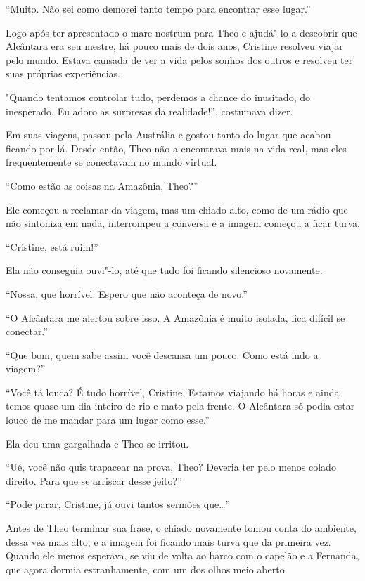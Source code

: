 ``Muito. Não sei como demorei tanto tempo para encontrar esse lugar.''

Logo após ter apresentado o mare nostrum para Theo e ajudá"-lo a
descobrir que Alcântara era seu mestre, há pouco mais de dois anos,
Cristine resolveu viajar pelo mundo. Estava cansada de ver a vida
pelos sonhos dos outros e resolveu ter suas próprias experiências.

"Quando tentamos controlar tudo, perdemos a chance do inusitado, do
inesperado. Eu adoro as surpresas da realidade!'', costumava dizer.

Em suas viagens, passou pela Austrália e gostou tanto do lugar que
acabou ficando por lá. Desde então, Theo não a encontrava mais na vida
real, mas eles frequentemente se conectavam no mundo virtual.

``Como estão as coisas na Amazônia, Theo?''

Ele começou a reclamar da viagem, mas um chiado alto, como de um rádio
que não sintoniza em nada, interrompeu a conversa e a imagem começou a
ficar turva.

``Cristine, está ruim!''

Ela não conseguia ouvi"-lo, até que tudo foi ficando silencioso novamente.

``Nossa, que horrível. Espero que não aconteça de novo.''

``O Alcântara me alertou sobre isso. A Amazônia é muito isolada, fica
difícil se conectar.''

``Que bom, quem sabe assim você descansa um pouco. Como está indo a
viagem?''

``Você tá louca? É tudo horrível, Cristine. Estamos viajando há horas e
ainda temos quase um dia inteiro de rio e mato pela frente. O Alcântara
só podia estar louco de me mandar para um lugar como esse.''

Ela deu uma gargalhada e Theo se irritou.

``Ué, você não quis trapacear na prova, Theo? Deveria ter pelo menos
colado direito. Para que se arriscar desse jeito?''

``Pode parar, Cristine, já ouvi tantos sermões que\ldots{}''

Antes de Theo terminar sua frase, o chiado novamente tomou conta do
ambiente, dessa vez mais alto, e a imagem foi ficando mais turva que da
primeira vez. Quando ele menos esperava, se viu de volta ao barco com o
capelão e a Fernanda, que agora dormia estranhamente, com um dos olhos
meio aberto.

\asterisc

